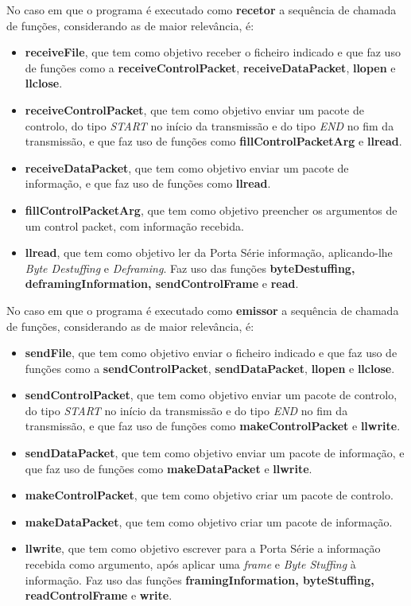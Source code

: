 \documentclass[a4paper, 11pt]{article}
\begin{document}
No caso em que o programa é executado como \textbf{recetor} a sequência de chamada de funções, considerando as de maior relevância, é:
\begin{itemize}
	\item \textbf{receiveFile}, que tem como objetivo receber o ficheiro indicado e que faz uso de funções como a \textbf{receiveControlPacket}, \textbf{receiveDataPacket}, \textbf{llopen} e \textbf{llclose}.
	\item \textbf{receiveControlPacket}, que tem como objetivo enviar um pacote de controlo, do tipo \textit{START} no início da transmissão e do tipo \textit{END} no fim da transmissão, e que faz uso de funções como \textbf{fillControlPacketArg} e \textbf{llread}.
	\item \textbf{receiveDataPacket},  que tem como objetivo enviar um pacote de informação, e que faz uso de funções como \textbf{llread}.
	\item \textbf{fillControlPacketArg}, que tem como objetivo preencher os argumentos de um control packet, com informação recebida.
	\item \textbf{llread}, que tem como objetivo ler da Porta Série informação, aplicando-lhe \textit{Byte Destuffing} e \textit{Deframing}. Faz uso das funções \textbf{byteDestuffing, deframingInformation, sendControlFrame} e \textbf{read}.
\end{itemize}

No caso em que o programa é executado como \textbf{emissor} a sequência de chamada de funções, considerando as de maior relevância, é:
\begin{itemize}
	\item \textbf{sendFile}, que tem como objetivo enviar o ficheiro indicado e que faz uso de funções como a \textbf{sendControlPacket}, \textbf{sendDataPacket}, \textbf{llopen} e \textbf{llclose}.
	\item \textbf{sendControlPacket}, que tem como objetivo enviar um pacote de controlo, do tipo \textit{START} no início da transmissão e do tipo \textit{END} no fim da transmissão, e que faz uso de funções como \textbf{makeControlPacket} e \textbf{llwrite}.
	\item \textbf{sendDataPacket},  que tem como objetivo enviar um pacote de informação, e que faz uso de funções como \textbf{makeDataPacket} e \textbf{llwrite}.
	\item \textbf{makeControlPacket}, que tem como objetivo criar um pacote de controlo.
	\item \textbf{makeDataPacket}, que tem como objetivo criar um pacote de informação.
	\item \textbf{llwrite}, que tem como objetivo escrever para a Porta Série a informação recebida como argumento, após aplicar uma \textit{frame} e \textit{Byte Stuffing} à informação. Faz uso das funções \textbf{framingInformation, byteStuffing, readControlFrame} e \textbf{write}.
\end{itemize}
\end{document}
